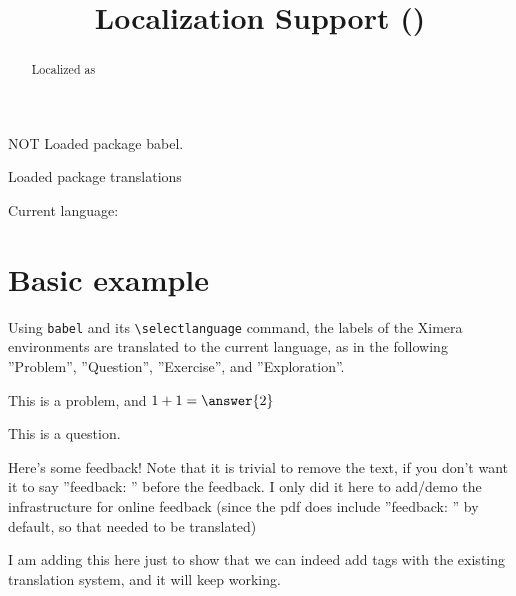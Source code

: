 \documentclass{ximera}
\title{Localization Support (\localename)}
\begin{document}
\begin{abstract}%
    Localized as \localename
\end{abstract}
\maketitle

\makeatletter
{}       {\phantom{NOT }}{NOT } Loaded package babel.

 Loaded package translations

 Current language:  \localename

\makeatother


\section*{Basic example}%

        Using \verb|babel| and its \verb|\selectlanguage| command, the labels of the Ximera environments are translated to the current language,
        as in the following ''Problem'', ''Question'', ''Exercise'', and ''Exploration''. 
        \begin{problem}%
            This is a problem, and $1+1 = \answer{2}$%
            \begin{multipleChoice}
            \end{multipleChoice}%
        \end{problem}
            
        \begin{question}
            This is a question.
            \begin{selectAll}
            \end{selectAll}%
            \begin{feedback}
                Here's some feedback! Note that it is trivial to remove the text, if you don't want it to say ''feedback: '' before the feedback. I only did it here to add/demo the infrastructure for online feedback (since the pdf does include ''feedback: '' by default, so that needed to be translated)%
            \end{feedback}
            \begin{feedback}[correct]
                I am adding this here just to show that we can indeed add tags with the existing translation system, and it will keep working.%
            \end{feedback}
        \end{question}
            
\end{document}
